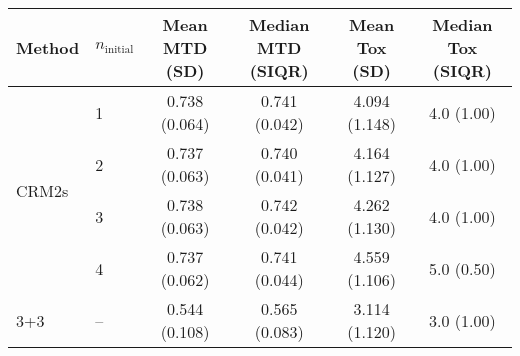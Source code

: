 \begin{tabular}{llcccc}
\toprule
Method & $n_{\text{initial}}$ & Mean MTD (SD)  & Median MTD (SIQR)  & Mean Tox (SD)  & Median Tox (SIQR)  \\
\midrule
\multirow{4}{*}{CRM2s} & 1 & 0.738 (0.064) & 0.741 (0.042) & 4.094 (1.148) & 4.0 (1.00) \\
 & 2 & 0.737 (0.063) & 0.740 (0.041) & 4.164 (1.127) & 4.0 (1.00) \\
 & 3 & 0.738 (0.063) & 0.742 (0.042) & 4.262 (1.130) & 4.0 (1.00) \\
 & 4 & 0.737 (0.062) & 0.741 (0.044) & 4.559 (1.106) & 5.0 (0.50) \\
\midrule
3+3 & -- & 0.544 (0.108) & 0.565 (0.083) & 3.114 (1.120) & 3.0 (1.00) \\
\bottomrule
\end{tabular}
